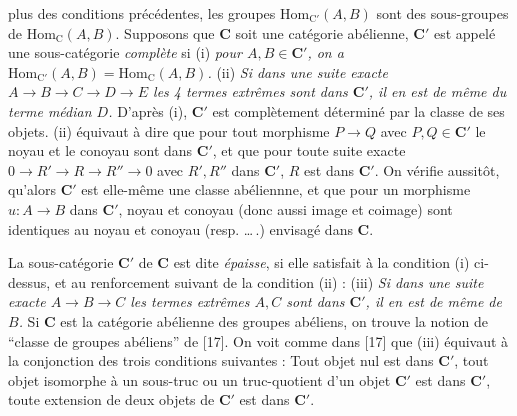 
\noindent plus des conditions précédentes, les groupes
$\mathrm{Hom}_{\mathrm{C}'}(A,B)$ sont des sous-groupes de
$\mathrm{Hom}_{\mathrm{C}}(A,B)$.
Supposons que $\mathbf{C}$ soit une catégorie abélienne, $\mathbf{C}'$ est appelé une
sous-catégorie \textit{complète} si (i) \textit{pour $A,B\in \mathbf{C}'$, on a
$\mathrm{Hom}_{\mathrm{C}'}(A,B)=\mathrm{Hom}_{\mathrm{C}}(A,B)$.} (ii) \textit{Si dans une
suite exacte $A\to B\to C\to
D\to E$ les 4 termes extrêmes sont dans $\mathbf{C}'$, il en est de même
du terme médian $D$.} D'après (i), $\mathbf{C}'$ est complètement déterminé par la
classe de ses objets. (ii) équivaut à dire que pour tout morphisme
$P\to Q$ avec $P,Q\in \mathbf{C}'$ le noyau et le conoyau sont dans $\mathbf{C}'$,
et que pour toute suite exacte
$0\to R'\to R\to R''\to 0$
avec $R',R''$ dans $\mathbf{C}'$, $R$ est dans $\mathbf{C}'$. On vérifie aussitôt, qu'alors
$\mathbf{C}'$ est elle-même une classe abéliennne, et que pour un morphisme
$u:A\to B$ dans $\mathbf{C}'$, noyau et conoyau (donc aussi image et
coimage) sont identiques au noyau et conoyau (resp. \ldots\,.) envisagé dans
$\mathbf{C}$.

La sous-catégorie $\mathbf{C}'$ de $\mathbf{C}$ est dite \textit{épaisse}, si elle satisfait à
la condition (i) ci-dessus, et au renforcement suivant de la condition (ii) :
(iii) \textit{Si dans une suite exacte
$A\to B\to C$ les termes extrêmes $A,C$ sont dans
$\mathbf{C}'$, il en est de même de $B$.} Si $\mathbf{C}$ est la catégorie abélienne des
groupes abéliens, on trouve la notion de ``classe de groupes abéliens'' de
[17]. On voit comme dans [17] que (iii) équivaut à la conjonction des trois
conditions suivantes : Tout objet nul est dans $\mathbf{C}'$, tout objet isomorphe à
un sous-truc ou un truc-quotient d'un objet $\mathbf{C}'$ est dans $\mathbf{C}'$, toute
extension de deux objets de $\mathbf{C}'$ est dans $\mathbf{C}'$.

